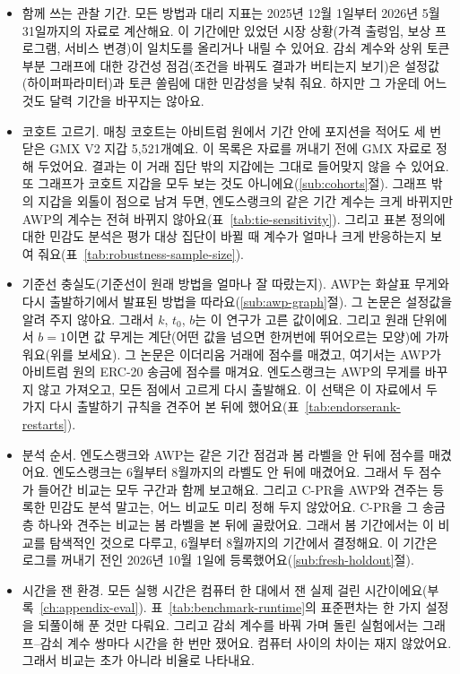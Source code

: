 
\begin{itemize}
\item 함께 쓰는 관찰 기간. 모든 방법과 대리 지표는 2025년 12월 1일부터 2026년 5월 31일까지의 자료로 계산해요. 이 기간에만 있었던 시장 상황(가격 출렁임, 보상 프로그램, 서비스 변경)이 일치도를 올리거나 내릴 수 있어요. 감쇠 계수와 상위 토큰 부분 그래프에 대한 강건성 점검(조건을 바꿔도 결과가 버티는지 보기)은 설정값(하이퍼파라미터)과 토큰 쏠림에 대한 민감성을 낮춰 줘요. 하지만 그 가운데 어느 것도 달력 기간을 바꾸지는 않아요.
\item 코호트 고르기. 매칭 코호트는 아비트럼 원에서 기간 안에 포지션을 적어도 세 번 닫은 GMX V2 지갑 5,521개예요. 이 목록은 자료를 꺼내기 전에 GMX 자료로 정해 두었어요. 결과는 이 거래 집단 밖의 지갑에는 그대로 들어맞지 않을 수 있어요. 또 그래프가 코호트 지갑을 모두 보는 것도 아니에요(\ref{sub:cohorts}절). 그래프 밖의 지갑을 외톨이 점으로 남겨 두면, 엔도스랭크의 같은 기간 계수는 크게 바뀌지만 AWP의 계수는 전혀 바뀌지 않아요(표~\ref{tab:tie-sensitivity}). 그리고 표본 정의에 대한 민감도 분석은 평가 대상 집단이 바뀔 때 계수가 얼마나 크게 반응하는지 보여 줘요(표~\ref{tab:robustness-sample-size}).
\item 기준선 충실도(기준선이 원래 방법을 얼마나 잘 따랐는지). AWP는 화살표 무게와 다시 출발하기에서 발표된 방법을 따라요(\ref{sub:awp-graph}절). 그 논문은 설정값을 알려 주지 않아요. 그래서 $k$, $t_0$, $b$는 이 연구가 고른 값이에요. 그리고 원래 단위에서 $b=1$이면 값 무게는 계단(어떤 값을 넘으면 한꺼번에 뛰어오르는 모양)에 가까워요(위를 보세요). 그 논문은 이더리움 거래에 점수를 매겼고, 여기서는 AWP가 아비트럼 원의 ERC-20 송금에 점수를 매겨요. 엔도스랭크는 AWP의 무게를 바꾸지 않고 가져오고, 모든 점에서 고르게 다시 출발해요. 이 선택은 이 자료에서 두 가지 다시 출발하기 규칙을 견주어 본 뒤에 했어요(표~\ref{tab:endorserank-restarts}).
\item 분석 순서. 엔도스랭크와 AWP는 같은 기간 점검과 봄 라벨을 안 뒤에 점수를 매겼어요. 엔도스랭크는 6월부터 8월까지의 라벨도 안 뒤에 매겼어요. 그래서 두 점수가 들어간 비교는 모두 구간과 함께 보고해요. 그리고 C-PR을 AWP와 견주는 등록한 민감도 분석 말고는, 어느 비교도 미리 정해 두지 않았어요. C-PR을 그 송금 층 하나와 견주는 비교는 봄 라벨을 본 뒤에 골랐어요. 그래서 봄 기간에서는 이 비교를 탐색적인 것으로 다루고, 6월부터 8월까지의 기간에서 결정해요. 이 기간은 로그를 꺼내기 전인 2026년 10월 1일에 등록했어요(\ref{sub:fresh-holdout}절).
\item 시간을 잰 환경. 모든 실행 시간은 컴퓨터 한 대에서 잰 실제 걸린 시간이에요(부록~\ref{ch:appendix-eval}). 표~\ref{tab:benchmark-runtime}의 표준편차는 한 가지 설정을 되풀이해 푼 것만 다뤄요. 그리고 감쇠 계수를 바꿔 가며 돌린 실험에서는 그래프--감쇠 계수 쌍마다 시간을 한 번만 쟀어요. 컴퓨터 사이의 차이는 재지 않았어요. 그래서 비교는 초가 아니라 비율로 나타내요.
\end{itemize}

